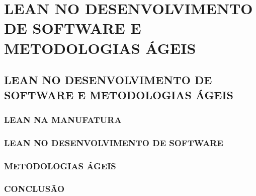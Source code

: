 \part{LEAN NO DESENVOLVIMENTO DE SOFTWARE E METODOLOGIAS ÁGEIS}

\chapter[Lean no Desenvolvimento de Software e Metodologias Ágeis]{LEAN NO DESENVOLVIMENTO DE SOFTWARE E METODOLOGIAS ÁGEIS}



\section[Lean na Manufatura]{LEAN NA MANUFATURA}

\section[Lean no Desenvolvimento de Software]{LEAN NO DESENVOLVIMENTO DE SOFTWARE}

\section[Metodologias Ágeis]{METODOLOGIAS ÁGEIS}

\section[Conclusão]{CONCLUSÃO}
